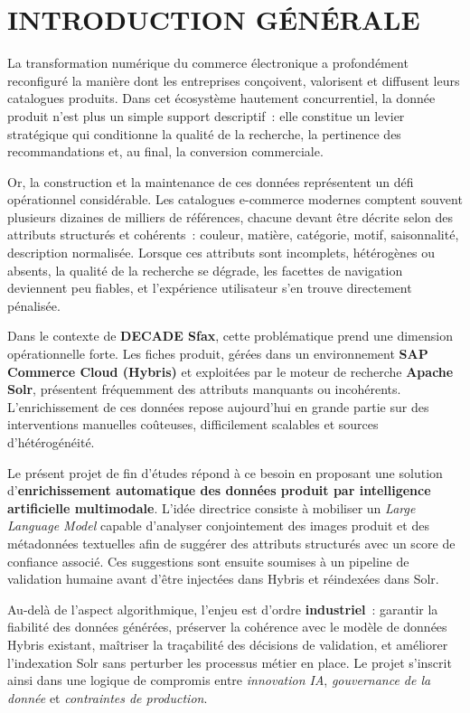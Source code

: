 \chapter*{INTRODUCTION GÉNÉRALE}
\thispagestyle{MyStyle}

La transformation numérique du commerce électronique a profondément reconfiguré la manière dont les entreprises conçoivent, valorisent et diffusent leurs catalogues produits. Dans cet écosystème hautement concurrentiel, la donnée produit n'est plus un simple support descriptif~: elle constitue un levier stratégique qui conditionne la qualité de la recherche, la pertinence des recommandations et, au final, la conversion commerciale.

Or, la construction et la maintenance de ces données représentent un défi opérationnel considérable. Les catalogues e-commerce modernes comptent souvent plusieurs dizaines de milliers de références, chacune devant être décrite selon des attributs structurés et cohérents~: couleur, matière, catégorie, motif, saisonnalité, description normalisée. Lorsque ces attributs sont incomplets, hétérogènes ou absents, la qualité de la recherche se dégrade, les facettes de navigation deviennent peu fiables, et l'expérience utilisateur s'en trouve directement pénalisée.

Dans le contexte de \textbf{DECADE Sfax}, cette problématique prend une dimension opérationnelle forte. Les fiches produit, gérées dans un environnement \textbf{SAP Commerce Cloud (Hybris)} et exploitées par le moteur de recherche \textbf{Apache Solr}, présentent fréquemment des attributs manquants ou incohérents. L'enrichissement de ces données repose aujourd'hui en grande partie sur des interventions manuelles coûteuses, difficilement scalables et sources d'hétérogénéité.

Le présent projet de fin d'études répond à ce besoin en proposant une solution d'\textbf{enrichissement automatique des données produit par intelligence artificielle multimodale}. L'idée directrice consiste à mobiliser un \textit{Large Language Model} capable d'analyser conjointement des images produit et des métadonnées textuelles afin de suggérer des attributs structurés avec un score de confiance associé. Ces suggestions sont ensuite soumises à un pipeline de validation humaine avant d'être injectées dans Hybris et réindexées dans Solr.

Au-delà de l'aspect algorithmique, l'enjeu est d'ordre \textbf{industriel}~: garantir la fiabilité des données générées, préserver la cohérence avec le modèle de données Hybris existant, maîtriser la traçabilité des décisions de validation, et améliorer l'indexation Solr sans perturber les processus métier en place. Le projet s'inscrit ainsi dans une logique de compromis entre \textit{innovation IA}, \textit{gouvernance de la donnée} et \textit{contraintes de production}.

